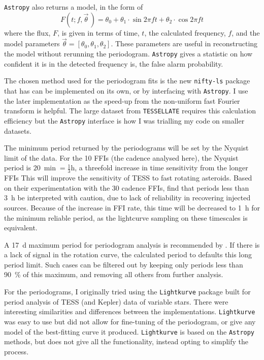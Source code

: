 \documentclass{UCreport}
\begin{document}
\texttt{Astropy} also returns a model, in the form of
\begin{equation}
  \label{Eq:LCModel}
  F(t;f,\vec{\theta}\,) = \theta_0 + \theta_1\cdot\sin{2\pi ft} +\theta_2\cdot\cos{2\pi ft}
\end{equation}
where the flux, $F$, is given in terms of time, $t$, the calculated frequency, $f$, and the model parameters $\vec{\theta} = [\theta_0, \theta_1,\theta_2]$.
These parameters are useful in reconstructing the model without rerunning the periodogram.
\texttt{Astropy} gives a statistic on how confident it is in the detected frequency is, the false alarm probability.

The chosen method used for the periodogram fits is the new \texttt{nifty-ls} package \citep{Garrison2024} that has can be implemented on its own, or by interfacing with \texttt{Astropy}.
I use the later implementation as the speed-up from the non-uniform fast Fourier transform is helpful.
The large dataset from \texttt{TESSELLATE} requires this calculation efficiency but the \texttt{Astropy} interface is how I was trialling my code on smaller datasets.

The minimum period returned by the periodograms will be set by the Nyquist limit of the data.
For the \qty{10}{\min} FFIs (the cadence analysed here), the Nyquist period is $\qty{20}{\min}=\frac13\unit{\hour}$, a threefold increase in time sensitivity from the longer FFIs
This will improve the sensitivity of TESS to fast rotating asteroids.
Based on their experimentation with the \qty{30}{\min} cadence FFIs, \citet{McNeill2023} find that periods less than \qty{3}{\hour} be interpreted with caution, due to lack of reliability in recovering injected sources.
Because of the increase in FFI rate, this time will be decreased to \qty{1}{\hour} for the minimum reliable period, as the lightcurve sampling on these timescales is equivalent.

A \qty{17}{\day} maximum period for periodogram analysis is recommended by \citeauthor{McNeill2023}.
If there is a lack of signal in the rotation curve, the calculated period to defaults this long period limit.
Such cases can be filtered out by keeping only periods less than \qty{90}{\percent} of this maximum, and removing all others from further analysis.

For the periodograms, I originally tried using the \texttt{Lightkurve} \citep{Lightkurve2018} package built for period analysis of TESS (and Kepler) data of variable stars.
There were interesting similarities and differences between the implementations.
\texttt{Lightkurve} was easy to use but did not allow for fine-tuning of the periodogram, or give any model of the best-fitting curve it produced.
\texttt{Lightkurve} is based on the \texttt{Astropy} methods, but does not give all the functionality, instead opting to simplify the process.
\end{document}
